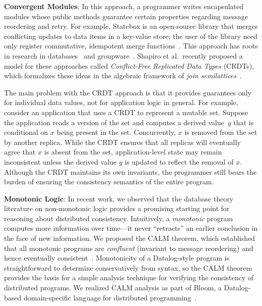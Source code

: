 \vspace{0.5em}\noindent
\textbf{Convergent Modules}: In this approach, a programmer writes encapsulated
modules whose public methods guarantee certain properties regarding message
reordering and retry. For example, Statebox is an open-source library that
merges conflicting updates to data items in a key-value store; the user of the
library need only register commutative, idempotent merge
functions~\cite{statebox}. This approach has roots in research in
databases~\cite{Farrag1989,Garcia-Molina1983,Helland2009} and
groupware~\cite{Ellis1989,Sun1998}.  Shapiro et al.\ recently proposed a model
for these approaches called \emph{Conflict-Free Replicated Data Types} (CRDTs),
which formalizes these ideas in the algebraic framework of {\em join
  semilattices}~\cite{Shapiro2011b}.

The main problem with the CRDT approach is that it provides guarantees only
for individual data values, not for application logic in general. For example,
consider an application that uses a CRDT to represent a mutable set. Suppose the
application reads a version of the set and computes a derived value~$y$ that is
conditional on $x$ being present in the set. Concurrently, $x$ is removed from
the set by another replica. While the CRDT ensures that all replicas will
eventually agree that $x$ is absent from the set, application-level state may
remain inconsistent unless the derived value $y$ is updated to reflect the
removal of $x$. Although the CRDT maintains its own invariants, the programmer
still bears the burden of ensuring the consistency semantics of the entire
program.


\vspace{0.5em} \noindent
\textbf{Monotonic Logic}: In recent work, we observed that the database theory
literature on non-monotonic logic provides a promising starting point for
reasoning about distributed consistency. Intuitively, a \emph{monotonic} program
computes more information over time---it never ``retracts'' an earlier
conclusion in the face of new information. We proposed the CALM theorem, which
established that all monotonic programs are \emph{confluent} (invariant to
message reordering) and hence eventually
consistent~\cite{Ameloot2011,Hellerstein2010,dedalus-confluence}. Monotonicity of
a Datalog-style program is straightforward to determine conservatively from
syntax, so the CALM theorem provides the basis for a simple analysis technique
for verifying the consistency of distributed programs. We realized CALM analysis
as part of Bloom, a Datalog-based domain-specific language for distributed
programming~\cite{Alvaro2011,bloom}.

